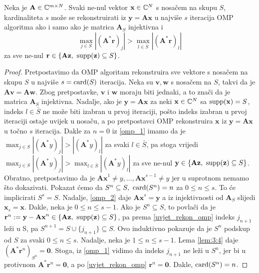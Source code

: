 \documentclass[a4paper,twoside,12pt]{memoir} %
\newcommand{\vect}[1]{\mathbf{#1}}
\renewcommand{\vec}{\vect}
\newcommand{\card}{\text{\normalfont{card}}}
\newcommand{\supp}{\text{\normalfont{supp}}}
\begin{document}
\begin{prop}\label{prop:3:5}
    Neka je $\vec A \in \C^{m \times N}$. Svaki ne-nul vektor $\vec x \in \C^N$ s nosa\v{c}em na skupu $S$, kardinaliteta $s$ mo\v{z}e se rekonstruirati iz $\vec y = \vec{Ax}$ u najvi\v{s}e $s$ iteracija OMP algoritma ako i samo ako je matrica $\vec A_S$ injektivna i 
    \begin{equation}\label{uvjet_rekon_omp}
        \max_{j \in S}|(\vec A^* \vec r)_j| > \max_{l \in \bar{S}}|(\vec A^* \vec r)_l|
    \end{equation}
    za sve ne-nul $\vec r \in \{\vec{Az},\ \supp(\vec z) \subseteq S\}$.
\end{prop}
\begin{proof}
    Pretpostavimo da OMP algoritam rekonstruira sve vektore s nosa\v{c}em na skupu $S$ u najvi\v{s}e $s = \card(S)$ iteracija. Neka su $\vec v, \vec w$ s nosa\v{c}em na $S$, takvi da je $\vec{Av}=\vec{Aw}$. Zbog pretpostavke, $\vec v$ i $\vec w$ moraju biti jednaki, a to zna\v{c}i da je matrica $\vec A_S$ injektivna. Nadalje, ako je $\vec y = \vec{Ax}$ za neki $\vec x \in \C^N$ sa $\supp(\vec x)=S$, indeks $l \in \bar S$ ne mo\v{z}e biti izabran u prvoj iteraciji, po\v{s}to indeks izabran u prvoj iteraciji ostaje uvijek u nosa\v{c}u, a po pretpostavci OMP rekonstruira $\vec x$ iz $\vec y = \vec{Ax}$ u to\v{c}no $s$ iteracija. Dakle za $n=0$ iz \eqref{omp_1} imamo da je $\max_{j \in S}|(\vec A^*y)_j| > |(\vec A^*y)_l|$ za svaki $l \in \bar{S}$, pa stoga vrijedi $\max_{j \in S}|(\vec A^*y)_j| > \max_{l \in \bar{S}}|(\vec A^*y)_l|$ za sve ne-nul $\vec y \in \{\vec{Az},\ \supp(\vec z) \subseteq S\}$. \\
    \indent
    Obratno, pretpostavimo da je $\vec{Ax}^1 \neq y,\dots,\vec{Ax}^{s-1} \neq y$ jer u suprotnom nemamo \v{s}to dokazivati. Pokazat \'cemo da $S^n \subseteq S,\ \card(S^n)=n$ za $0 \leq n \leq s$. To \'ce implicirati $S^s = S$. Nadalje, \eqref{omp_2} daje $\vec{Ax}^s = \vec y$ a iz injektivnosti od $\vec{A}_S$ slijedi $\vec x_s = \vec{x}$. Dakle, neka je $0 \leq n \leq s-1$. Ako je $S^n \subseteq S$, to povla\v{c}i da je $\vec r^n := \vec y - \vec{Ax}^n \in \{\vec{Az},\ \supp(\vec z) \subseteq S\}$, pa prema \eqref{uvjet_rekon_omp} indeks $j_{n+1}$ le\v{z}i u S, pa $S^{n+1} = S \cup \{j_{n+1}\} \subseteq S$. Ovo induktivno pokazuje da je $S^n$ podskup od $S$ za svaki $0 \leq n \leq s$. Nadalje, neka je $1 \leq n \leq s-1$. Lema \eqref{lem:3:4} daje $(\vec{A}^* \vec r^n)_{S^n} = \vec 0$. Stoga, iz \eqref{omp_1} vidimo da indeks $j_{n+1}$ ne le\v{z}i u $S^{n}$, jer bi u protivnom $\vec A^* \vec r^n = \vec 0$, a po \eqref{uvjet_rekon_omp} $\vec r^n = \vec 0$. Dakle, $\card(S^n)=n$.
\end{proof}
\end{document}
